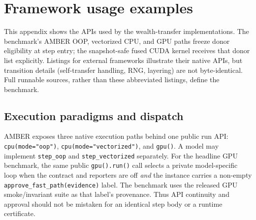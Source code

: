 \documentclass[sigconf,nonacm,review,natbib=true]{acmart}
\newcommand{\appendixbreak}{%
  \FloatBarrier
}
\theoremstyle{definition}
\theoremstyle{plain}
\theoremstyle{remark}
\begin{document}
\appendixbreak
\section{Framework usage examples}
\label{app:usage}

This appendix shows the APIs used by the wealth-transfer implementations. The
benchmark's AMBER OOP, vectorized CPU, and GPU paths freeze donor eligibility
at step entry; the snapshot-safe fused CUDA kernel receives that donor list
explicitly.
Listings for external frameworks illustrate their native APIs, but transition
details (self-transfer handling, RNG, layering) are not byte-identical. Full
runnable sources, rather than these abbreviated listings, define the benchmark.

\subsection{Execution paradigms and dispatch}
\label{app:usage:overview}

AMBER exposes three native execution paths behind one public run API:
\texttt{cpu(mode="oop")}, \texttt{cpu(mode="vectorized")}, and
\texttt{gpu()}. A model may implement \texttt{step\_oop} and
\texttt{step\_vectorized} separately. For the headline GPU benchmark, the same
public \texttt{gpu().run()} call selects a private model-specific loop when the
contract and reporters are off \emph{and} the instance carries a non-empty
\texttt{approve\_\allowbreak fast\_\allowbreak path(\allowbreak evidence)}
label. The benchmark uses the released
GPU smoke/invariant suite as that label's provenance. Thus API continuity and
approval should not be mistaken for an identical step body or a runtime
certificate.
\end{document}
